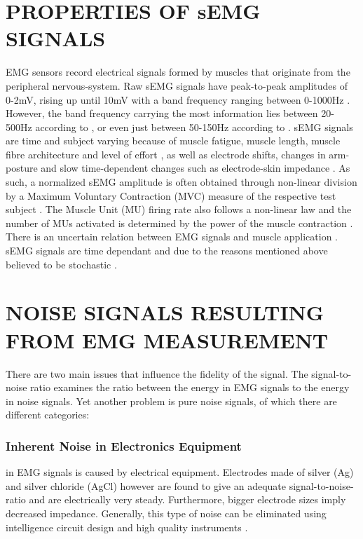 \documentclass{article}
\begin{document}


\section{PROPERTIES OF sEMG SIGNALS}
EMG sensors record electrical signals formed by muscles that originate from the peripheral nervous-system. Raw sEMG signals have peak-to-peak amplitudes of 0-2mV, rising up until 10mV \cite{Sulaiman2016} with a band frequency ranging between 0-1000Hz \cite{Soderberg1984}. However, the band frequency carrying the most information lies between 20-500Hz according to \cite{Boxtel2001} \cite{Kim2016}, or even just between 50-150Hz according to \cite{Sulaiman2016}. 
sEMG signals are time and subject varying because of muscle fatigue, muscle length, muscle fibre architecture and level of effort \cite{Kim2016} \cite{Nazmi2016}, as well as electrode shifts, changes in arm-posture and slow time-dependent changes such as electrode-skin impedance \cite{Castellini2009} \cite{Farina2014}. As such, a normalized sEMG amplitude is often obtained through non-linear division by a Maximum Voluntary Contraction (MVC) measure of the respective test subject \cite{Boccia2015} \cite{Martinez-Valdes2016}. The Muscle Unit (MU) firing rate also follows a non-linear law \cite{Luca2010} and the number of MUs activated is determined by the power of the muscle contraction \cite{Piccoli2014}. 
There is an uncertain relation between EMG signals and muscle application \cite{Dieterich2017}. sEMG signals are time dependant \cite{Kim2016} and due to the reasons mentioned above believed to be stochastic \cite{Poo2010} \cite{Rogers2013}\cite{Thongpanja2013} \cite{Clancy1999}. 

\section{NOISE SIGNALS RESULTING FROM EMG MEASUREMENT \cite{Nazmi2016}}
There are two main issues that influence the fidelity of the signal. The signal-to-noise ratio examines the ratio between the energy in EMG signals to the energy in noise signals. Yet another problem is pure noise signals, of which there are different categories:

\subsubsection{Inherent Noise in Electronics Equipment} in EMG signals is caused by electrical equipment. Electrodes made of silver (Ag) and silver chloride (AgCl) however are found to give an adequate signal-to-noise-ratio and are electrically very steady. Furthermore, bigger electrode sizes imply decreased impedance. Generally, this type of noise can be eliminated using intelligence circuit design and high quality instruments \cite{Nazmi2016}. 
\end{document}
